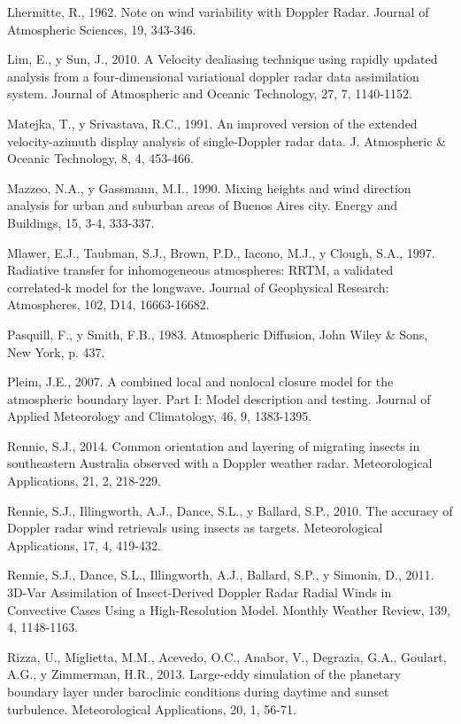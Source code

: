 \documentclass[12pt,spanish,oneside, a4paper]{book}
\begin{document}
\hypertarget{ref-Lhermitte1962}{}
Lhermitte, R., 1962. Note on wind variability with Doppler Radar.
Journal of Atmospheric Sciences, 19, 343-346.

\hypertarget{ref-Lim2010}{}
Lim, E., y Sun, J., 2010. A Velocity dealiasing technique using rapidly
updated analysis from a four-dimensional variational doppler radar data
assimilation system. Journal of Atmospheric and Oceanic Technology, 27,
7, 1140-1152.

\hypertarget{ref-Matejka1991}{}
Matejka, T., y Srivastava, R.C., 1991. An improved version of the
extended velocity-azimuth display analysis of single-Doppler radar data.
J. Atmospheric \& Oceanic Technology, 8, 4, 453-466.

\hypertarget{ref-Mazzeo1990}{}
Mazzeo, N.A., y Gassmann, M.I., 1990. Mixing heights and wind direction
analysis for urban and suburban areas of Buenos Aires city. Energy and
Buildings, 15, 3-4, 333-337.

\hypertarget{ref-Mlawer1997}{}
Mlawer, E.J., Taubman, S.J., Brown, P.D., Iacono, M.J., y Clough, S.A.,
1997. Radiative transfer for inhomogeneous atmospheres: RRTM, a
validated correlated-k model for the longwave. Journal of Geophysical
Research: Atmospheres, 102, D14, 16663-16682.

\hypertarget{ref-Pasquill1983}{}
Pasquill, F., y Smith, F.B., 1983. Atmospheric Diffusion, John Wiley \&
Sons, New York, p. 437.

\hypertarget{ref-Pleim2007}{}
Pleim, J.E., 2007. A combined local and nonlocal closure model for the
atmospheric boundary layer. Part I: Model description and testing.
Journal of Applied Meteorology and Climatology, 46, 9, 1383-1395.

\hypertarget{ref-Rennie2014}{}
Rennie, S.J., 2014. Common orientation and layering of migrating insects
in southeastern Australia observed with a Doppler weather radar.
Meteorological Applications, 21, 2, 218-229.

\hypertarget{ref-Rennie2010}{}
Rennie, S.J., Illingworth, A.J., Dance, S.L., y Ballard, S.P., 2010. The
accuracy of Doppler radar wind retrievals using insects as targets.
Meteorological Applications, 17, 4, 419-432.

\hypertarget{ref-Rennie2011}{}
Rennie, S.J., Dance, S.L., Illingworth, A.J., Ballard, S.P., y Simonin,
D., 2011. 3D-Var Assimilation of Insect-Derived Doppler Radar Radial
Winds in Convective Cases Using a High-Resolution Model. Monthly Weather
Review, 139, 4, 1148-1163.

\hypertarget{ref-Rizza2013}{}
Rizza, U., Miglietta, M.M., Acevedo, O.C., Anabor, V., Degrazia, G.A.,
Goulart, A.G., y Zimmerman, H.R., 2013. Large-eddy simulation of the
planetary boundary layer under baroclinic conditions during daytime and
sunset turbulence. Meteorological Applications, 20, 1, 56-71.
\end{document}

